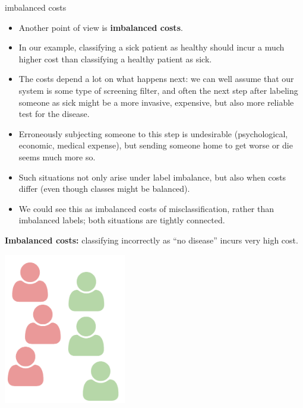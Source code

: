 \documentclass[11pt,compress,t,notes=noshow, xcolor=table]{beamer}
\begin{document}
\begin{vbframe}{imbalanced costs}
 
\begin{itemize}
  \item Another point of view is \textbf{imbalanced costs}.
  \item In our example, classifying a sick patient as healthy should incur a 
  much higher cost than classifying a healthy patient as sick.
  \item The costs depend a lot on what happens next: we can well assume that 
  our system is some type of screening filter, and often the next step after 
  labeling someone as sick might be a more invasive, expensive, but also  more 
  reliable test for the disease.
  \item Erroneously subjecting someone to this step is undesirable 
  (psychological, economic, medical expense), but sending someone home to get 
  worse or die seems much more so.
  \item Such situations not only arise under label imbalance, but also when 
  costs differ (even though classes might be balanced).
  \item We could see this as imbalanced costs of misclassification, rather than 
  imbalanced labels; both situations are tightly connected.
\end{itemize}

\framebreak

\lz

\begin{minipage}[c]{0.65\textwidth}
  \raggedright
  \textbf{Imbalanced costs: } classifying incorrectly as \enquote{no disease} 
  incurs very high cost.
\end{minipage}%
\begin{minipage}[c]{0.35\textwidth}
  \centering
  \includegraphics[trim = 0 0 0 10, clip, width=0.4\textwidth]
  {figure_man/imbalanced-costs.pdf}
\end{minipage}


\end{vbframe}
\end{document}
